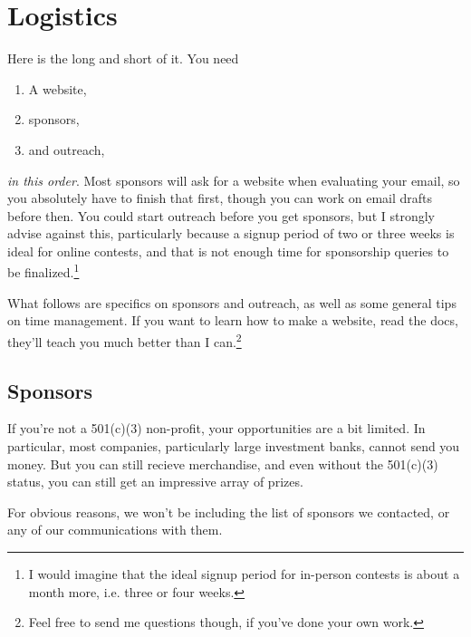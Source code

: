 \documentclass[points=false]{bounce}
\begin{document}
\section{Logistics}

Here is the long and short of it. You need
\begin{enumerate}
    \item A website,
    \item sponsors,
    \item and outreach,
\end{enumerate}
\emph{in this order}. Most sponsors will ask for a website when evaluating your email, so you absolutely have to finish that first, though you can work on email drafts before then. You could start outreach before you get sponsors, but I strongly advise against this, particularly because a signup period of two or three weeks is ideal for online contests, and that is not enough time for sponsorship queries to be finalized.\footnote{I would imagine that the ideal signup period for in-person contests is about a month more, i.e. three or four weeks.}

What follows are specifics on sponsors and outreach, as well as some general tips on time management. If you want to learn how to make a website, read the docs, they'll teach you much better than I can.\footnote{Feel free to send me questions though, if you've done your own work.}

\subsection{Sponsors}

If you're not a 501(c)(3) non-profit, your opportunities are a bit limited. In particular, most companies, particularly large investment banks, cannot send you money. But you can still recieve merchandise, and even without the 501(c)(3) status, you can still get an impressive array of prizes.

For obvious reasons, we won't be including the list of sponsors we contacted,
or any of our communications with them.
\end{document}
